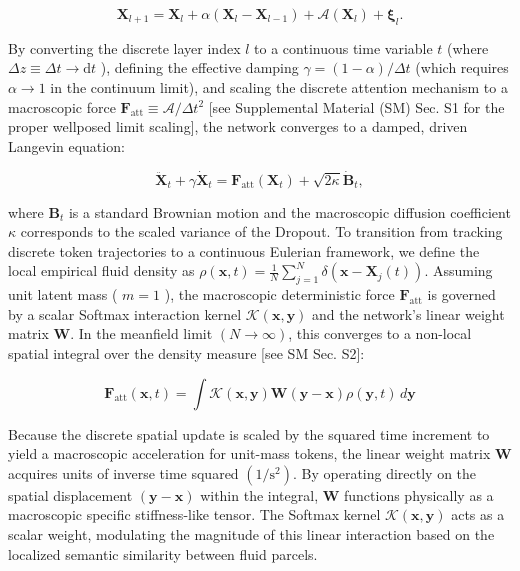 \documentclass[10pt]{article}
\begin{document}
\begin{equation}
\mathbf{X}_{l+1}=\mathbf{X}_{l}+\alpha\left(\mathbf{X}_{l}-\mathbf{X}_{l-1}\right)+\mathcal{A}\left(\mathbf{X}_{l}\right)+\boldsymbol{\xi}_{l} .
\end{equation}


By converting the discrete layer index $l$ to a continuous time variable $t$ (where $\Delta z \equiv \Delta t \rightarrow \mathrm{d}t$ ), defining the effective damping $\gamma=(1-\alpha) / \Delta t$ (which requires $\alpha \rightarrow 1$ in the continuum limit), and scaling the discrete attention mechanism to a macroscopic force $\mathbf{F}_{\mathrm{att}} \equiv \mathcal{A} / \Delta t^{2}$ [see Supplemental Material (SM) Sec. S1 for the proper wellposed limit scaling], the network converges to a damped, driven Langevin equation:


\begin{equation}
\ddot{\mathbf{X}}_{t}+\gamma \dot{\mathbf{X}}_{t}=\mathbf{F}_{\mathrm{att}}\left(\mathbf{X}_{t}\right)+\sqrt{2 \kappa} \dot{\mathbf{B}}_{t},
\end{equation}


where $\mathbf{B}_{t}$ is a standard Brownian motion and the macroscopic diffusion coefficient $\kappa$ corresponds to the scaled variance of the Dropout. To transition from tracking discrete token trajectories to a continuous Eulerian framework, we define the local empirical fluid density as $\rho(\mathbf{x}, t)=\frac{1}{N} \sum_{j=1}^{N} \delta\left(\mathbf{x}-\mathbf{X}_{j}(t)\right)$. Assuming unit latent mass ( $m=1$ ), the macroscopic deterministic force $\mathbf{F}_{\mathrm{att}}$ is governed by a scalar Softmax interaction kernel $\mathcal{K}(\mathbf{x}, \mathbf{y})$ and the network's linear weight matrix $\mathbf{W}$. In the meanfield limit $(N \rightarrow \infty)$, this converges to a non-local spatial integral over the density measure [see SM Sec. S2]:


\begin{equation}
\mathbf{F}_{\mathrm{att}}(\mathbf{x}, t)=\int \mathcal{K}(\mathbf{x}, \mathbf{y}) \mathbf{W}(\mathbf{y}-\mathbf{x}) \rho(\mathbf{y}, t)\,d\mathbf{y}
\end{equation}


Because the discrete spatial update is scaled by the squared time increment to yield a macroscopic acceleration for unit-mass tokens, the linear weight matrix $\mathbf{W}$ acquires units of inverse time squared $\left(1 / \mathrm{s}^{2}\right)$. By operating directly on the spatial displacement $(\mathbf{y}-\mathbf{x})$ within the integral, $\mathbf{W}$ functions physically as a macroscopic specific stiffness-like tensor. The Softmax kernel $\mathcal{K}(\mathbf{x}, \mathbf{y})$ acts as a scalar weight, modulating the magnitude of this linear interaction based on the localized semantic similarity between fluid parcels.
\end{document}
